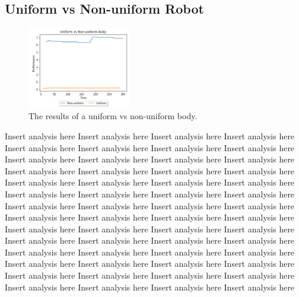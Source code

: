 \documentclass{article}
\begin{document}
\subsection{Uniform vs Non-uniform Robot}
\begin{figure}
    \centering
    \vspace*{-5mm}
    \includegraphics[width=0.4\textwidth]{uniformResults}
    \vspace*{-7mm}
    \caption{The results of a uniform vs non-uniform body.}
\end{figure}
Insert analysis here Insert analysis here Insert analysis here Insert analysis here Insert analysis here Insert analysis here Insert analysis here Insert analysis here Insert analysis here Insert analysis here Insert analysis here Insert analysis here Insert analysis here Insert analysis here Insert analysis here Insert analysis here Insert analysis here Insert analysis here Insert analysis here Insert analysis here Insert analysis here Insert analysis here Insert analysis here Insert analysis here Insert analysis here Insert analysis here Insert analysis here Insert analysis here Insert analysis here Insert analysis here Insert analysis here Insert analysis here Insert analysis here Insert analysis here Insert analysis here Insert analysis here Insert analysis here Insert analysis here Insert analysis here Insert analysis here Insert analysis here Insert analysis here Insert analysis here Insert analysis here Insert analysis here Insert analysis here Insert analysis here Insert analysis here Insert analysis here Insert analysis here Insert analysis here Insert analysis here Insert analysis here Insert analysis here Insert analysis here Insert analysis here
\end{document}
